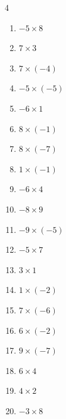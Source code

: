 \begin{multicols}{4}
\begin{enumerate}
  \item $-5\times 8$
        \phantom{$=-40$}

  \item $7\times 3$
        \phantom{$=21$}

  \item $7\times (-4)$
        \phantom{$=-28$}

  \item $-5\times (-5)$
        \phantom{$=25$}

  \item $-6\times 1$
        \phantom{$=-6$}

\columnbreak %

\resetques

  \item $8\times (-1)$
        \phantom{$=-8$}

  \item $8\times (-7)$
        \phantom{$=-56$}

  \item $1\times (-1)$
        \phantom{$=-1$}

  \item $-6\times 4$
        \phantom{$=-24$}

  \item $-8\times 9$
        \phantom{$=-72$}

  \item $-9\times (-5)$
        \phantom{$=45$}

  \item $-5\times 7$
        \phantom{$=-35$}

  \item $3\times 1$
        \phantom{$=3$}

  \item $1\times (-2)$
        \phantom{$=-2$}

  \item $7\times (-6)$
        \phantom{$=-42$}

  \item $6\times (-2)$
        \phantom{$=-12$}

  \item $9\times (-7)$
        \phantom{$=-63$}

  \item $6\times 4$
        \phantom{$=24$}

  \item $4\times 2$
        \phantom{$=8$}

  \item $-3\times 8$
        \phantom{$=-24$}


\end{enumerate}
\end{multicols}
